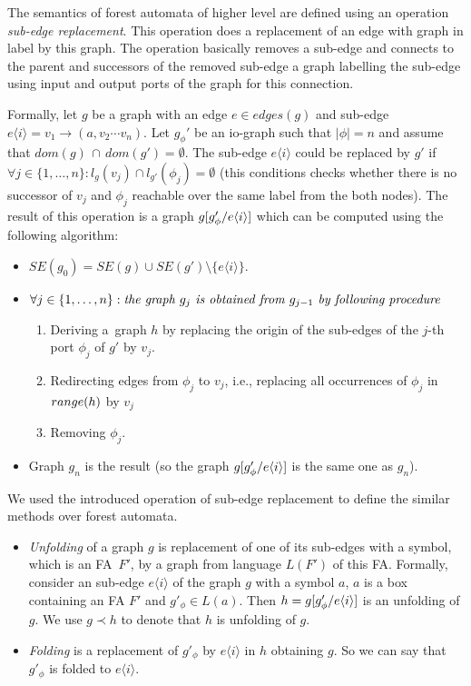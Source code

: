 \documentclass[a4paper, 12pt]{article}
\begin{document}
The semantics of forest automata of higher level are defined
using an operation \emph{sub-edge replacement}.
This operation does a replacement of an edge with graph in label
by this graph.
The operation basically removes a sub-edge and connects
to the parent and successors of the removed sub-edge a graph
labelling the sub-edge using input and output ports
of the graph for this connection.

Formally, let $g$ be a graph with an edge $e \in edges(g)$ and sub-edge $e\langle i\rangle = v_1 \rightarrow (a,v_2 \cdots v_n)$.
Let $g_{\phi}'$ be an io-graph such that $|\phi| = n$ and assume that ${dom(g)}\, \cap\, {dom(g')} = \emptyset$.
The sub-edge $e\langle i\rangle$ could be replaced by $g'$ if $\forall j \in \{1,\ldots,n\}: l_{g}(v_j) \cap
l_{g'}(\phi_j) = \emptyset$
(this conditions checks whether there is no successor of $v_j$ and $\phi_j$ reachable over the same
label from the both nodes).
The result of this operation is a graph $g[g'_\phi/e\langle i\rangle]$
which can be computed using the following algorithm:
\begin{itemize}
	\item $SE(g_0) = SE(g) \cup SE(g') \setminus \{e\langle i\rangle\}$.
	\item $\forall j \in \{1, \ldots, n\}: \emph{the graph } g_j \emph{ is obtained from } g_{j-1} \emph{ by following procedure }$
		\begin{enumerate}
			\item Deriving a~graph $h$ by replacing the origin of the sub-edges of the $j$-th port $\phi_j$ of $g'$ by $v_j$.
			\item Redirecting edges from $\phi_{j}$ to $v_j$, i.e., replacing all occurrences of $\phi_j$ in $range(h)$ by $v_j$
			\item Removing $\phi_j$. 
		\end{enumerate}
	\item Graph $g_n$ is the result (so the graph $g[g'_\phi/e\langle i\rangle]$ is the same one as $g_n$).
\end{itemize}

We used the introduced operation of sub-edge replacement to define
the similar methods over forest automata.
\begin{itemize}
	\item \emph{Unfolding} of a graph $g$ is replacement of one of its sub-edges with a symbol, which is
		an FA~$F'$, by a graph from language $L(F')$ of this FA.
		Formally, consider an sub-edge $e\langle i \rangle$ of the graph $g$ with a symbol $a$,
		$a$ is a box containing an FA $F'$ and $g'_\phi \in L(a)$.
		Then $h = g [g'_\phi/e\langle i \rangle]$ is an unfolding of $g$.
		We use $g \prec h$ to denote that $h$ is unfolding of $g$.
	\item \emph{Folding} is a replacement of $g'_\phi$ by $e \langle i \rangle$ in $h$ obtaining $g$.
		So we can say that $g'_\phi$ is folded to $e \langle i \rangle$. 
\end{itemize}
\end{document}
